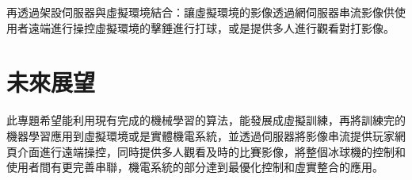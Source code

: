  再透過架設伺服器與虛擬環境結合：讓虛擬環境的影像透過網伺服器串流影像供使用者遠端進行操控虛擬環境的擊錘進行打球，或是提供多人進行觀看對打影像。
\iffalse
\begin{figure}[hbt!]
\begin{center}
\texttt{[image: 研究架構]}
\caption{\Large 研究架構 }
\label{研究架構 }
\end{center}
\end{figure}
\fi
\section{未來展望}
此專題希望能利用現有完成的機械學習的算法，能發展成虛擬訓練，再將訓練完的機器學習應用到虛擬環境或是實體機電系統，並透過伺服器將影像串流提供玩家網頁介面進行遠端操控，同時提供多人觀看及時的比賽影像，將整個冰球機的控制和使用者間有更完善串聯，機電系統的部分達到最優化控制和虛實整合的應用。
